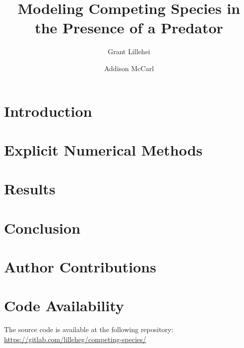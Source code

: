 \documentclass[runningheads]{llncs}
\begin{document}
%
\title{Modeling Competing Species in the Presence of a Predator}
%
%
\author{Grant Lillehei \and
Addison McCarl}

%
%

%
\maketitle              %
%
\begin{abstract}

\end{abstract}
%
%
%
\section{Introduction}


\section{Explicit Numerical Methods}


\section{Results}


\section{Conclusion}


\section{Author Contributions}





\section*{Code Availability}
The source code is available at the following repository: \url{https://gitlab.com/lilleheg/competing-species/}
\end{document}
